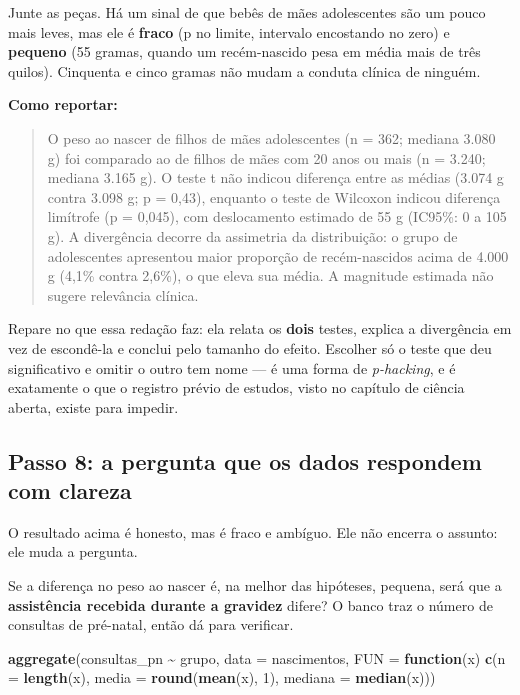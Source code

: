 \documentclass[
]{book}
\newenvironment{Shaded}{\begin{snugshade}}{\end{snugshade}}
\newcommand{\AttributeTok}[1]{\textcolor[rgb]{0.13,0.29,0.53}{#1}}
\newcommand{\ControlFlowTok}[1]{\textcolor[rgb]{0.13,0.29,0.53}{\textbf{#1}}}
\newcommand{\DecValTok}[1]{\textcolor[rgb]{0.00,0.00,0.81}{#1}}
\newcommand{\FunctionTok}[1]{\textcolor[rgb]{0.13,0.29,0.53}{\textbf{#1}}}
\newcommand{\NormalTok}[1]{#1}
\newcommand{\SpecialCharTok}[1]{\textcolor[rgb]{0.81,0.36,0.00}{\textbf{#1}}}
\begin{document}
Junte as peças. Há um sinal de que bebês de mães adolescentes são um pouco mais leves, mas ele é \textbf{fraco} (p no limite, intervalo encostando no zero) e \textbf{pequeno} (55 gramas, quando um recém-nascido pesa em média mais de três quilos). Cinquenta e cinco gramas não mudam a conduta clínica de ninguém.

\textbf{Como reportar:}

\begin{quote}
O peso ao nascer de filhos de mães adolescentes (n = 362; mediana 3.080 g) foi comparado ao de filhos de mães com 20 anos ou mais (n = 3.240; mediana 3.165 g). O teste t não indicou diferença entre as médias (3.074 g contra 3.098 g; p = 0,43), enquanto o teste de Wilcoxon indicou diferença limítrofe (p = 0,045), com deslocamento estimado de 55 g (IC95\%: 0 a 105 g). A divergência decorre da assimetria da distribuição: o grupo de adolescentes apresentou maior proporção de recém-nascidos acima de 4.000 g (4,1\% contra 2,6\%), o que eleva sua média. A magnitude estimada não sugere relevância clínica.
\end{quote}

Repare no que essa redação faz: ela relata os \textbf{dois} testes, explica a divergência em vez de escondê-la e conclui pelo tamanho do efeito. Escolher só o teste que deu significativo e omitir o outro tem nome --- é uma forma de \emph{p-hacking}, e é exatamente o que o registro prévio de estudos, visto no capítulo de ciência aberta, existe para impedir.

\subsection{Passo 8: a pergunta que os dados respondem com clareza}\label{passo-8-a-pergunta-que-os-dados-respondem-com-clareza}

O resultado acima é honesto, mas é fraco e ambíguo. Ele não encerra o assunto: ele muda a pergunta.

Se a diferença no peso ao nascer é, na melhor das hipóteses, pequena, será que a \textbf{assistência recebida durante a gravidez} difere? O banco traz o número de consultas de pré-natal, então dá para verificar.

\begin{Shaded}
\begin{Highlighting}[]
\FunctionTok{aggregate}\NormalTok{(consultas\_pn }\SpecialCharTok{\textasciitilde{}}\NormalTok{ grupo, }\AttributeTok{data =}\NormalTok{ nascimentos,}
          \AttributeTok{FUN =} \ControlFlowTok{function}\NormalTok{(x) }\FunctionTok{c}\NormalTok{(}\AttributeTok{n =} \FunctionTok{length}\NormalTok{(x),}
                              \AttributeTok{media =} \FunctionTok{round}\NormalTok{(}\FunctionTok{mean}\NormalTok{(x), }\DecValTok{1}\NormalTok{),}
                              \AttributeTok{mediana =} \FunctionTok{median}\NormalTok{(x)))}
\end{Highlighting}
\end{Shaded}
\end{document}
